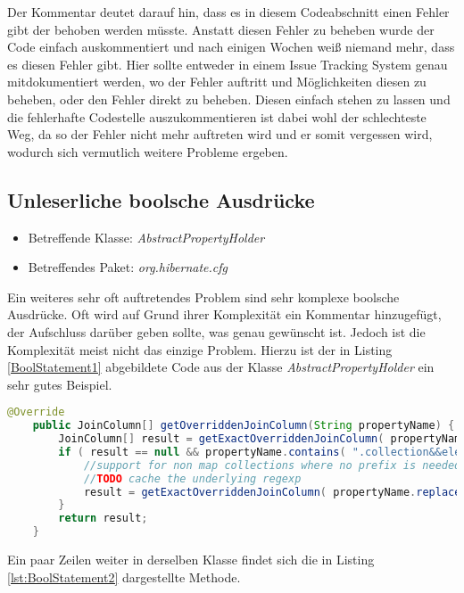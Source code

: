 Der Kommentar deutet darauf hin, dass es in diesem Codeabschnitt einen Fehler gibt der behoben werden müsste. Anstatt diesen Fehler zu beheben wurde der Code einfach auskommentiert und nach einigen Wochen weiß niemand mehr, dass es diesen Fehler gibt. Hier sollte entweder in einem Issue Tracking System genau mitdokumentiert werden, wo der Fehler auftritt und Möglichkeiten diesen zu beheben, oder den Fehler direkt zu beheben. Diesen einfach stehen zu lassen und die fehlerhafte Codestelle auszukommentieren ist dabei wohl der schlechteste Weg, da so der Fehler nicht mehr auftreten wird und er somit vergessen wird, wodurch sich vermutlich weitere Probleme ergeben.
 
\subsection{Unleserliche boolsche Ausdrücke}
\label{cha:BadBoolStatements}
\begin{itemize}
	\item Betreffende Klasse: \textit{AbstractPropertyHolder}
	\item Betreffendes Paket: \textit{org.hibernate.cfg}
\end{itemize}

\SuperPar Ein weiteres sehr oft auftretendes Problem sind sehr komplexe boolsche Ausdrücke. Oft wird auf Grund ihrer Komplexität ein Kommentar hinzugefügt, der Aufschluss darüber geben sollte, was genau gewünscht ist. Jedoch ist die Komplexität meist nicht das einzige Problem. Hierzu ist der in Listing \ref{BoolStatement1} abgebildete Code aus der Klasse \textit{AbstractPropertyHolder} ein sehr gutes Beispiel.

\begin{lstlisting}[language=Java, caption=Komplexe boolsche Ausdrücke 1 Zeile 255 - 264, label=lst:BoolStatement1]
	@Override
	public JoinColumn[] getOverriddenJoinColumn(String propertyName) {
		JoinColumn[] result = getExactOverriddenJoinColumn( propertyName );
		if ( result == null && propertyName.contains( ".collection&&element." ) ) {
			//support for non map collections where no prefix is needed
			//TODO cache the underlying regexp
			result = getExactOverriddenJoinColumn( propertyName.replace( ".collection&&element.", "."  ) );
		}
		return result;
	}
\end{lstlisting}

Ein paar Zeilen weiter in derselben Klasse findet sich die in Listing \ref{lst:BoolStatement2} dargestellte Methode.

